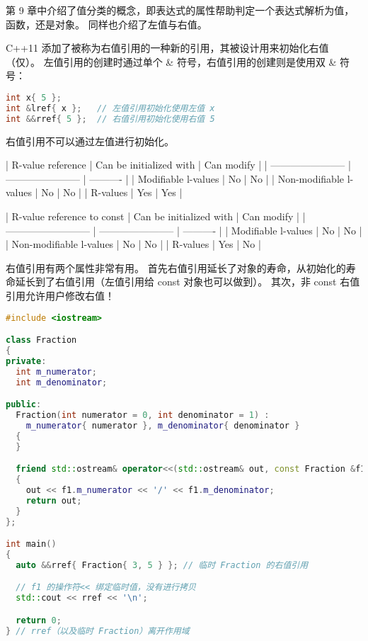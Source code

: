 \documentclass[../../LearnCpp.tex]{subfiles}
\begin{document}

第 9 章中介绍了值分类的概念，即表达式的属性帮助判定一个表达式解析为值，函数，还是对象。
同样也介绍了左值与右值。

C++11 添加了被称为右值引用的一种新的引用，其被设计用来初始化右值（仅）。
左值引用的创建时通过单个 \& 符号，右值引用的创建则是使用双 \& 符号：

\begin{lstlisting}[language=C++]
int x{ 5 };
int &lref{ x };   // 左值引用初始化使用左值 x
int &&rref{ 5 };  // 右值引用初始化使用右值 5
\end{lstlisting}

右值引用不可以通过左值进行初始化。

| R-value reference       | Can be initialized with | Can modify |
| ----------------------- | ----------------------- | ---------- |
| Modifiable l-values     | No                      | No         |
| Non-modifiable l-values | No                      | No         |
| R-values                | Yes                     | Yes        |

| R-value reference to const | Can be initialized with | Can modify |
| -------------------------- | ----------------------- | ---------- |
| Modifiable l-values        | No                      | No         |
| Non-modifiable l-values    | No                      | No         |
| R-values                   | Yes                     | No         |

右值引用有两个属性非常有用。
首先右值引用延长了对象的寿命，从初始化的寿命延长到了右值引用（左值引用给 const 对象也可以做到）。
其次，非 const 右值引用允许用户修改右值！

\begin{lstlisting}[language=C++]
#include <iostream>

class Fraction
{
private:
  int m_numerator;
  int m_denominator;

public:
  Fraction(int numerator = 0, int denominator = 1) :
    m_numerator{ numerator }, m_denominator{ denominator }
  {
  }

  friend std::ostream& operator<<(std::ostream& out, const Fraction &f1)
  {
    out << f1.m_numerator << '/' << f1.m_denominator;
    return out;
  }
};

int main()
{
  auto &&rref{ Fraction{ 3, 5 } }; // 临时 Fraction 的右值引用

  // f1 的操作符<< 绑定临时值，没有进行拷贝
  std::cout << rref << '\n';

  return 0;
} // rref（以及临时 Fraction）离开作用域
\end{lstlisting}
\end{document}
